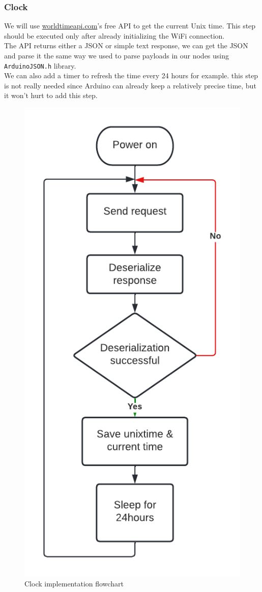 \subsubsection{Clock}
We will use \href{www.worldtimeapi.org}{worldtimeapi.com}'s free API to get the current Unix time. This step should be executed only after already initializing the WiFi connection. \\
The API returns either a JSON or simple text response, we can get the JSON and parse it the same way we used to parse payloads in our nodes using \verb|ArduinoJSON.h| library.\\
We can also add a timer to refresh the time every 24 hours for example. this step is not really needed since Arduino can already keep a relatively precise time, but it won't hurt to add this step. 
\begin{figure}[H]
    \centering
    \includegraphics[width=.4\textwidth]{images/central/clock_flowchart.png}
    \caption{Clock implementation flowchart}
\end{figure}

